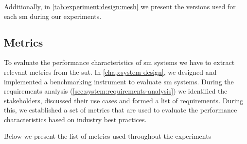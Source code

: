 Additionally, in \cref{tab:experiment:design:mesh} we present the versions used for each \gls{sm} during our experiments.




\subsection{Metrics}
\label{sec:experiments:design:metrics}

To evaluate the performance characteristics of \gls{sm} systems we have to extract relevant metrics from the \gls{sut}. In \cref{chap:system-design}, we designed and implemented a benchmarking instrument to evaluate \gls{sm} systems. During the requirements analysis (\cref{sec:system:requirements-analysis}) we identified the stakeholders, discussed their use cases and formed a list of requirements. During this, we established a set of metrics that are used to evaluate the performance characteristics based on industry best practices.

Below we present the list of metrics used throughout the experiments

